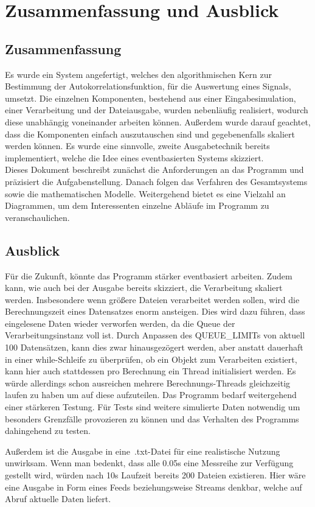 \chapter{Zusammenfassung und Ausblick}\label{ch:zusammenfassung-und-ausblick}


\section{Zusammenfassung}\label{sec:zusammenfassung}
Es wurde ein System angefertigt, welches den algorithmischen Kern zur Bestimmung der Autokorrelationsfunktion, für die Auswertung eines Signals, umsetzt.
Die einzelnen Komponenten, bestehend aus einer Eingabesimulation, einer Verarbeitung und der Dateiausgabe, wurden nebenläufig realisiert, wodurch diese unabhängig voneinander arbeiten können.
Außerdem wurde darauf geachtet, dass die Komponenten einfach auszutauschen sind und gegebenenfalls skaliert werden können.
Es wurde eine sinnvolle, zweite Ausgabetechnik bereits implementiert, welche die Idee eines eventbasierten Systems skizziert.\\

Dieses Dokument beschreibt zunächst die Anforderungen an das Programm und präzisiert die Aufgabenstellung.
Danach folgen das Verfahren des Gesamtsystems sowie die mathematischen Modelle.
Weitergehend bietet es eine Vielzahl an Diagrammen, um dem Interessenten einzelne Abläufe im Programm zu veranschaulichen.


\section{Ausblick}\label{sec:ausblick}
Für die Zukunft, könnte das Programm stärker eventbasiert arbeiten.
Zudem kann, wie auch bei der Ausgabe bereits skizziert, die Verarbeitung skaliert werden.
Insbesondere wenn größere Dateien verarbeitet werden sollen, wird die Berechnungszeit eines Datensatzes enorm ansteigen.
Dies wird dazu führen, dass eingelesene Daten wieder verworfen werden, da die Queue der Verarbeitungsinstanz voll ist.
Durch Anpassen des QUEUE\_LIMITs von aktuell 100 Datensätzen, kann dies zwar hinausgezögert werden, aber anstatt dauerhaft in einer while-Schleife zu überprüfen, ob ein Objekt zum Verarbeiten existiert, kann hier auch stattdessen pro Berechnung ein Thread initialisiert werden.
Es würde allerdings schon ausreichen mehrere Berechnungs-Threads gleichzeitig laufen zu haben um auf diese aufzuteilen.
Das Programm bedarf weitergehend einer stärkeren Testung.
Für Tests sind weitere simulierte Daten notwendig um besonders Grenzfälle provozieren zu können und das Verhalten des Programms dahingehend zu testen.

Außerdem ist die Ausgabe in eine~.txt-Datei für eine realistische Nutzung unwirksam.
Wenn man bedenkt, dass alle 0.05s eine Messreihe zur Verfügung gestellt wird, würden nach 10s Laufzeit bereits 200 Dateien existieren.
Hier wäre eine Ausgabe in Form eines Feeds beziehungsweise Streams denkbar, welche auf Abruf aktuelle Daten liefert.


